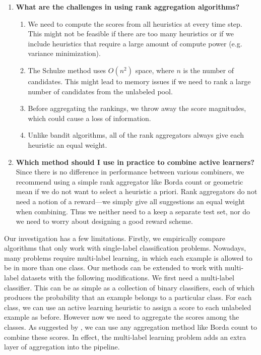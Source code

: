 \documentclass[fleqn,10pt,lineno]{wlpeerj} %
\begin{document}
\begin{enumerate}
	\item \textbf{What are the challenges in using rank aggregation
	algorithms?}
	\begin{enumerate}
		\item We need to compute the scores from all heuristics at every time
		step. This might not be feasible if there are too many heuristics or if
		we include heuristics that require a large amount of compute power
		(e.g. variance minimization).
		\item The Schulze method uses $O(n^2)$ space, where $n$ is the number
		of candidates. This might lead to memory issues if we need to rank
		a large number of candidates from the unlabeled pool.
		\item Before aggregating the rankings, we throw away the score
		magnitudes, which could cause a loss of information.
		\item Unlike bandit algorithms, all of the rank aggregators always give
		each heuristic an equal weight.
	\end{enumerate}

	\item \textbf{Which method should I use in practice to combine active
	learners?} Since there is no difference in performance between various
	combiners,  we recommend using a simple rank aggregator like Borda count or
	geometric mean if we do not want to select a heuristic a priori. Rank
	aggregators do not need a notion of a reward---we simply give all
	suggestions an equal weight when combining. Thus we neither need to a keep
	a separate test set, nor do we need to worry about designing a good reward
	scheme.
\end{enumerate}

Our investigation has a few limitations. Firstly, we empirically compare
algorithms that only work with single-label classification problems. Nowadays,
many problems require multi-label learning, in which each example is allowed to
be in more than one class. Our methods can be extended to work with multi-label
datasets with the following modifications. We first need a multi-label
classifier. This can be as simple as a collection of binary classifiers, each
of which produces the probability that an example belongs to a particular
class. For each class, we can use an active learning heuristic to assign a
score to each unlabeled example as before. However now we need to aggregate the
scores among the classes. As suggested by \cite{reyes17}, we can use any
aggregation method like Borda count to combine these scores. In effect, the
multi-label learning problem adds an extra layer of aggregation into the
pipeline.
\end{document}

